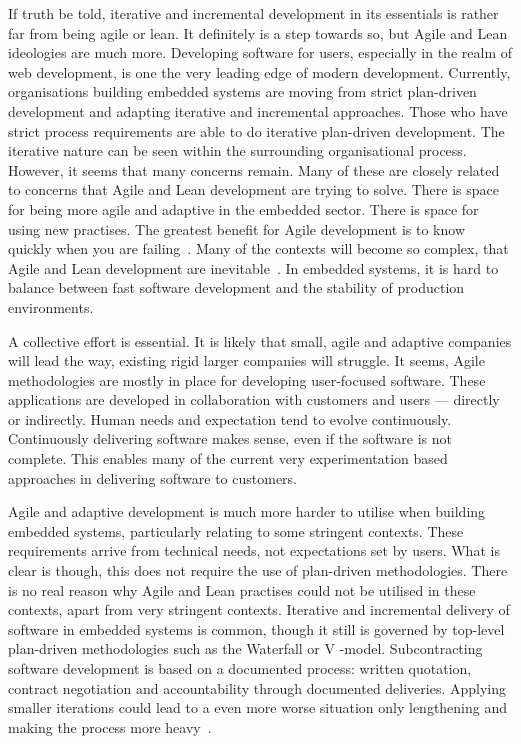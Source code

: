 \documentclass[english]{tktltiki2}
\begin{document}
If truth be told, iterative and incremental development in its essentials is rather far from being agile or lean. It definitely is a step towards so, but Agile and Lean ideologies are much more. Developing software for users, especially in the realm of web development, is one the very leading edge of modern development. Currently, organisations building embedded systems are moving from strict plan-driven development and adapting iterative and incremental approaches. Those who have strict process requirements are able to do iterative plan-driven development. The iterative nature can be seen within the surrounding organisational process. However, it seems that many concerns remain. Many of these are closely related to concerns that Agile and Lean development are trying to solve. There is space for being more agile and adaptive in the embedded sector. There is space for using new practises. The greatest benefit for Agile development is to know quickly when you are failing~\cite{Hol15a}. Many of the contexts will become so complex, that Agile and Lean development are inevitable~\cite{Hol15a}. In embedded systems, it is hard to balance between fast software development and the stability of production environments.

A collective effort is essential. It is likely that small, agile and adaptive companies will lead the way, existing rigid larger companies will struggle. It seems, Agile methodologies are mostly in place for developing user-focused software. These applications are developed in collaboration with customers and users — directly or indirectly. Human needs and expectation tend to evolve continuously. Continuously delivering software makes sense, even if the software is not complete. This enables many of the current very experimentation based approaches in delivering software to customers.

Agile and adaptive development is much more harder to utilise when building embedded systems, particularly relating to some stringent contexts. These requirements arrive from technical needs, not expectations set by users. What is clear is though, this does not require the use of plan-driven methodologies. There is no real reason why Agile and Lean practises could not be utilised in these contexts, apart from very stringent contexts. Iterative and incremental delivery of software in embedded systems is common, though it still is governed by top-level plan-driven methodologies such as the Waterfall or V -model. Subcontracting software development is based on a documented process: written quotation, contract negotiation and accountability through documented deliveries. Applying smaller iterations could lead to a even more worse situation only lengthening and making the process more heavy~\cite{Hol15b}.
\end{document}
